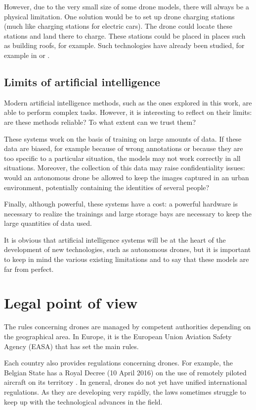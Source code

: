 However, due to the very small size of some drone models, there will always be a physical limitation. One solution would be to set up drone charging stations (much like charging stations for electric cars). The drone could locate these stations and land there to charge. These stations could be placed in places such as building roofs, for example. Such technologies have already been studied, for example in \cite{edronic2021battery} or \cite{rohan2018development}.

\subsection{Limits of artificial intelligence}

Modern artificial intelligence methods, such as the ones explored in this work, are able to perform complex tasks. However, it is interesting to reflect on their limits: are these methods reliable? To what extent can we trust them?

These systems work on the basis of training on large amounts of data. If these data are biased, for example because of wrong annotations or because they are too specific to a particular situation, the models may not work correctly in all situations. Moreover, the collection of this data may raise confidentiality issues: would an autonomous drone be allowed to keep the images captured in an urban environment, potentially containing the identities of several people?

Finally, although powerful, these systems have a cost: a powerful hardware is necessary to realize the trainings and large storage bays are necessary to keep the large quantities of data used.

It is obvious that artificial intelligence systems will be at the heart of the development of new technologies, such as autonomous drones, but it is important to keep in mind the various existing limitations and to say that these models are far from perfect.

\section{Legal point of view}

The rules concerning drones are managed by competent authorities depending on the geographical area. In Europe, it is the European Union Aviation Safety Agency (EASA) \cite{easa2021website} that has set the main rules.

Each country also provides regulations concerning drones. For example, the Belgian State has a Royal Decree (10 April 2016) on the use of remotely piloted aircraft on its territory \cite{assurancedronebe2021website}. In general, drones do not yet have unified international regulations. As they are developing very rapidly, the laws sometimes struggle to keep up with the technological advances in the field.

